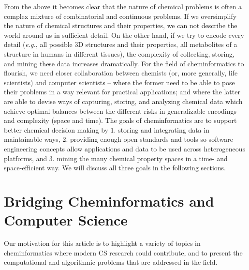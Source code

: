 \documentclass{sig-alternate}
\begin{document}
From the above it becomes clear that the nature of chemical problems
is often a complex mixture of combinatorial and continuous
problems. If we oversimplify the nature of chemical structures and
their properties, we can not describe the world around us in
sufficient detail. On the other hand, if we try to encode every detail
(\emph{e.g.}, all possible 3D structures and their properties, all
metabolites of a structure in humans in different tissues), the
complexity of collecting, storing, and mining these data increases
dramatically. For the field of cheminformatics to flourish, we need
closer collaboration between chemists (or, more generally, life
scientists) and computer scientists -- where the former need to be
able to pose their problems in a way relevant for practical
applications; and where the latter are able to devise ways of
capturing, storing, and analyzing chemical data which achieve optimal
balances between the different risks in generalizable encodings and
complexity (space and time). The goals of cheminformatics are to
support better chemical decision making by 1. storing and integrating
data in maintainable ways, 2.  providing enough open standards and
tools so software engineering concepts allow applications and data to
be used across heterogeneous platforms, and 3. mining the many
chemical property spaces in a time- and space-efficient way. We will
discuss all three goals in the following sections.

\section{Bridging Cheminformatics and Computer Science}

Our motivation for this article is to highlight a variety of topics in
cheminformatics where modern CS research could contribute, and
to present the computational and algorithmic problems
that are addressed in the field.
\end{document}

